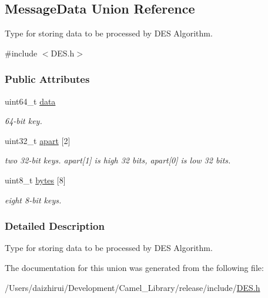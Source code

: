 \hypertarget{a00138}{}\subsection{Message\+Data Union Reference}
\label{a00138}


Type for storing data to be processed by D\+ES Algorithm.  




{\ttfamily \#include $<$D\+E\+S.\+h$>$}

\subsubsection*{Public Attributes}
\begin{DoxyCompactItemize}
\item 
\mbox{\label{a00138_a2cf9dd28d0679205048930fe98fa116b}} 
uint64\+\_\+t \mbox{\hyperlink{a00138_a2cf9dd28d0679205048930fe98fa116b}{data}}
\begin{DoxyCompactList}\small\item\em 64-\/bit key. \end{DoxyCompactList}\item 
\mbox{\label{a00138_a43406dd2e72f1230b8f70551a96699c5}} 
uint32\+\_\+t \mbox{\hyperlink{a00138_a43406dd2e72f1230b8f70551a96699c5}{apart}} \mbox{[}2\mbox{]}
\begin{DoxyCompactList}\small\item\em two 32-\/bit keys. apart\mbox{[}1\mbox{]} is high 32 bits, apart\mbox{[}0\mbox{]} is low 32 bits. \end{DoxyCompactList}\item 
\mbox{\label{a00138_aaceaebf6f0349dae52e2c1c2a462b654}} 
uint8\+\_\+t \mbox{\hyperlink{a00138_aaceaebf6f0349dae52e2c1c2a462b654}{bytes}} \mbox{[}8\mbox{]}
\begin{DoxyCompactList}\small\item\em eight 8-\/bit keys. \end{DoxyCompactList}\end{DoxyCompactItemize}


\subsubsection{Detailed Description}
Type for storing data to be processed by D\+ES Algorithm. 

The documentation for this union was generated from the following file\+:\begin{DoxyCompactItemize}
\item 
/\+Users/daizhirui/\+Development/\+Camel\+\_\+\+Library/release/include/\mbox{\hyperlink{a00005}{D\+E\+S.\+h}}\end{DoxyCompactItemize}
